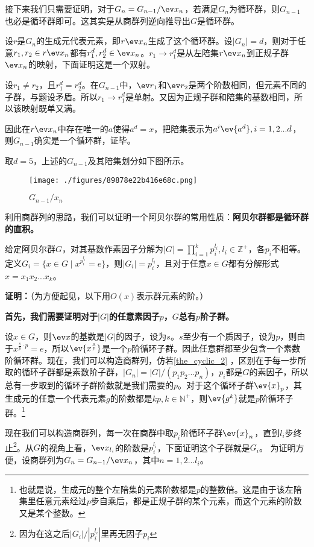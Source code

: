 接下来我们只需要证明，对于$G_{n}=G_{n-1}/\ev x_n$，若满足$G_{n}$为循环群，则$G_{n-1}$也必是循环群即可。这其实是从商群列逆向推导出$G$是循环群。

设$r$是$G_n$的生成元代表元素，即$r\ev x_n$生成了这个循环群。设$|G_{n}|=d$，则对于任意$r_1,r_2\in r\ev x_n$都有$r_1^d,r_2^d\in\ev x_n$。$r_1\rightarrow r_1^d$是从左陪集$r\ev x_n$到正规子群$\ev x_n$的映射，下面证明这是一个双射。

设$r_1\neq r_2$，且$r_1^d=r_2^d$。在$G_{n-1}$中，$\ev r_1$和$\ev r_2$是两个阶数相同，但元素不同的子群，与题设矛盾。所以$r_1\rightarrow r_1^d$是单射。又因为正规子群和陪集的基数相同，所以该映射既单又满。

因此在$r\ev x_n$中存在唯一的$a$使得$a^d=x$，把陪集表示为$a^i\ev {a^d},i=1,2...d$，则$G_{n-1}$确实是一个循环群，证毕。

取$d=5$，上述的$G_{n-1}$及其陪集划分如下图所示。
\begin{figure}[ht]
\centering
\texttt{[image: ./figures/89878e22b416e68c.png]}
\caption{$G_{n-1}/x_n$} \label{fig_cyclic_2}
\end{figure}
利用商群列的思路，我们可以证明一个阿贝尔群的常用性质：\textbf{阿贝尔群都是循环群的直积。
}
\begin{theorem}{}
给定阿贝尔群$G$，对其基数作素因子分解为$|G|=\prod_{i=1}^{k} p_{i}^{l_{i}},l_i\in\mathbb{Z}^+$，各$p_i$不相等。
定义$G_i = \{x \in G \mid x^{p_i^{l_i}} = e\}$，则$|G_i|=p_i^{l_i}$，且对于任意$x\in G$都有分解形式$x=x_1x_2...x_k$。
\end{theorem}
\textbf{证明：}（为方便起见，以下用$O(x)$表示群元素的阶。）

\textbf{首先，我们需要证明对于$|G|$的任意素因子$p$，$G$总有$p$阶子群。}

设$x\in G$，则$\ev x$的基数是$|G|$的因子，设为$s$。$s$至少有一个质因子，设为$p$，则由于$x^{\frac{s}{p}\cdot p}=e$，所以$\ev {x^{\frac{s}{p}}}$是一个$p$阶循环子群。因此任意群都至少包含一个素数阶循环群。现在，我们可以构造商群列，仿若\autoref{the_cyclic_2} ，区别在于每一步所取的循环子群都是素数阶子群，$|G_n|=|G|/(p_1p_2...p_n)$，$p_i$都是$G$的素因子，所以总有一步取到的循环子群阶数就是我们需要的$p$。对于这个循环子群$\ev {x}_p$，其生成元的任意一个代表元素$g$的阶数都是$kp,k\in \mathbb N^{+}$，则$\ev{g^k}$就是$p$阶循环子群。\footnote{也就是说，生成元的整个左陪集的元素阶数都是$p$的整数倍。这是由于该左陪集里任意元素经过$p$步自乘后，都是正规子群的某个元素，而这个元素的阶数又是某个整数。}

现在我们可以构造商群列，每一次在商群中取$p_i$阶循环子群$\ev{x}_{n}$，直到$l_i$步终止\footnote{因为在这之后$|G_i|/|p_i^{l_i}|$里再无因子$p_i$}。从$G$的视角上看，$\ev x_{l_i}$的阶数是$p_i^{l_i}$，下面证明这个子群就是$G_i$。
为证明方便，设商群列为$G_n=G_{n-1}/\ev x_n$，其中$ n=1,2...l_i$。

